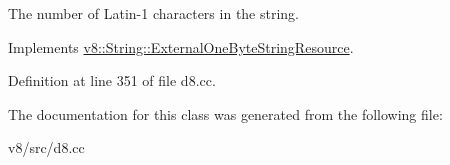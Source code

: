 The number of Latin-\/1 characters in the string. 

Implements \mbox{\hyperlink{classv8_1_1String_1_1ExternalOneByteStringResource_ad6b702f05798bcfc3975cb922f32b5ab}{v8\+::\+String\+::\+External\+One\+Byte\+String\+Resource}}.



Definition at line 351 of file d8.\+cc.



The documentation for this class was generated from the following file\+:\begin{DoxyCompactItemize}
\item 
v8/src/d8.\+cc\end{DoxyCompactItemize}
